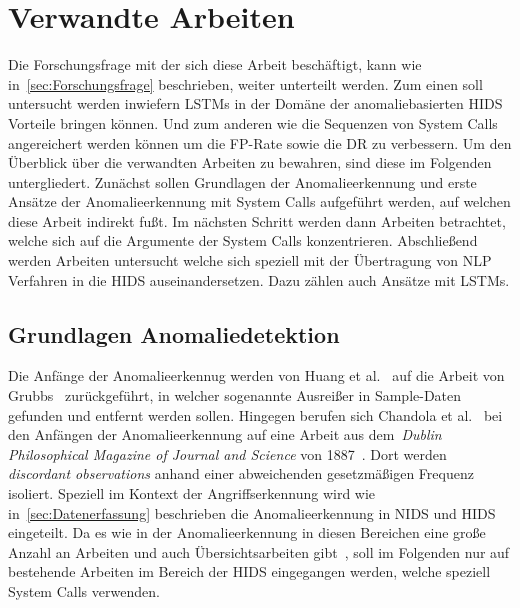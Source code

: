 \chapter{Verwandte Arbeiten}\label{ch:verwandte_arbeiten}

Die Forschungsfrage mit der sich diese Arbeit beschäftigt, kann wie in~\autoref{sec:Forschungsfrage} beschrieben, weiter unterteilt werden.
Zum einen soll untersucht werden inwiefern \acp{LSTM} in der Domäne der anomaliebasierten \ac{HIDS} Vorteile bringen können.
Und zum anderen wie die Sequenzen von System Calls angereichert werden können um die \ac{FP}-Rate sowie die \acf{DR} zu verbessern.
Um den Überblick über die verwandten Arbeiten zu bewahren, sind diese im Folgenden untergliedert.
Zunächst sollen Grundlagen der Anomalieerkennung und erste Ansätze der Anomalieerkennung mit System Calls aufgeführt werden, auf welchen diese Arbeit indirekt fußt.
Im nächsten Schritt werden dann Arbeiten betrachtet, welche sich auf die Argumente der System Calls konzentrieren.
Abschließend werden Arbeiten untersucht welche sich speziell mit der Übertragung von \ac{NLP} Verfahren in die \ac{HIDS} auseinandersetzen.
Dazu zählen auch Ansätze mit \acp{LSTM}.

    \section{Grundlagen Anomaliedetektion}

        Die Anfänge der Anomalieerkennug werden von Huang et al.~\cite{ANOMALYBOOKKISHAN2017} auf die Arbeit von Grubbs~\cite{ANOMALYDEFINITION1969} zurückgeführt, in welcher sogenannte Ausreißer in Sample-Daten gefunden und entfernt werden sollen.
        Hingegen berufen sich Chandola et al.~\cite{ANOMALYSURVEY} bei den Anfängen der Anomalieerkennung auf eine Arbeit aus dem~\textit{Dublin Philosophical Magazine of Journal and Science} von 1887~\cite{ANOMALYDEFINITION1887}.
        Dort werden \textit{discordant observations} anhand einer abweichenden gesetzmäßigen Frequenz isoliert. 
        Speziell im Kontext der Angriffserkennung wird wie in~\autoref{sec:Datenerfassung} beschrieben die Anomalieerkennung in \ac{NIDS} und \ac{HIDS} eingeteilt.
        Da es wie in der Anomalieerkennung in diesen Bereichen eine große Anzahl an Arbeiten und auch Übersichtsarbeiten gibt~\cite{ANOMALYSURVEY, ANOMALYSURVEY2, ANOMALYSURVEY3}, soll im Folgenden nur auf bestehende Arbeiten im Bereich der \ac{HIDS} eingegangen werden, welche speziell System Calls verwenden.

